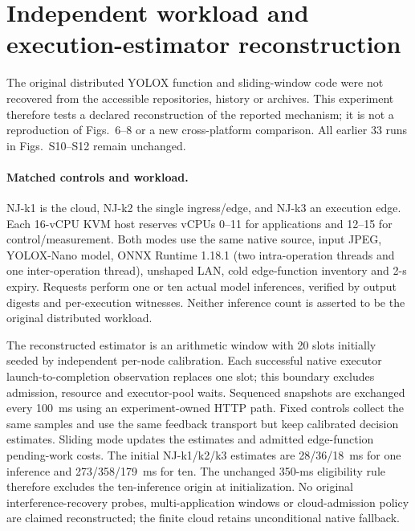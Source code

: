 \clearpage
\section*{Independent workload and execution-estimator reconstruction}
\label{sec:estimator-reconstruction}
The original distributed YOLOX function and sliding-window code were not recovered from the accessible repositories, history or archives. This experiment therefore tests a declared reconstruction of the reported mechanism; it is not a reproduction of Figs.~6--8 or a new cross-platform comparison. All earlier 33 runs in Figs.~S10--S12 remain unchanged.

\paragraph{Matched controls and workload.}
NJ-k1 is the cloud, NJ-k2 the single ingress/edge, and NJ-k3 an execution edge. Each 16-vCPU KVM host reserves vCPUs 0--11 for applications and 12--15 for control/measurement. Both modes use the same native source, input JPEG, YOLOX-Nano model, ONNX Runtime 1.18.1 (two intra-operation threads and one inter-operation thread), unshaped LAN, cold edge-function inventory and 2-s expiry. Requests perform one or ten actual model inferences, verified by output digests and per-execution witnesses. Neither inference count is asserted to be the original distributed workload.

The reconstructed estimator is an arithmetic window with 20 slots initially seeded by independent per-node calibration. Each successful native executor launch-to-completion observation replaces one slot; this boundary excludes admission, resource and executor-pool waits. Sequenced snapshots are exchanged every 100~ms using an experiment-owned HTTP path. Fixed controls collect the same samples and use the same feedback transport but keep calibrated decision estimates. Sliding mode updates the estimates and admitted edge-function pending-work costs. The initial NJ-k1/k2/k3 estimates are 28/36/18~ms for one inference and 273/358/179~ms for ten. The unchanged 350-ms eligibility rule therefore excludes the ten-inference origin at initialization. No original interference-recovery probes, multi-application windows or cloud-admission policy are claimed reconstructed; the finite cloud retains unconditional native fallback.

